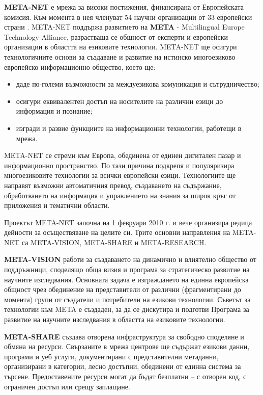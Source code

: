   \begin{multicols}{2}

    \textbf{META-NET} е мрежа за високи постижения, финансирана от Европейската
    комисия. Към момента в нея членуват 54 научни организации от 33 европейски страни \cite{rehm2011}. META-NET поддържа развитието
    на \textbf{META}  - Multilingual Europe Technology Alliance, разрастваща се общност от експерти и
    европейски организации в областта на езиковите
    технологии. META-NET ще осигури  технологичните основи за създаване и развитие на истинско многоезиково европейско информационно общество, което ще:

  \begin{itemize}
  \item даде по-големи възможности за междуезикова комуникация и сътрудничество;
  \item осигури еквивалентен достъп на носителите на различни езици до информация и познание;
  \item изгради и развие функциите на информационни технологии, работещи в мрежа.
  \end{itemize}

META-NET  се стреми към Европа, обединена от единен дигитален пазар и информационно пространство. По тази причина подкрепя и популяризира многоезиковите технологии за всички
  европейски езици. Технологиите ще направят възможни автоматичния
  превод, създаването на съдържание, обработването на информация и
  управлението на знания за широк кръг от приложения и тематични
  области. 

  Проектът META-NET започна на 1 февруари 2010 г.  и вече организира редица дейности  за осъществяване на целите си. Трите основни направления на META-NET
  са META-VISION, META-SHARE и META-RESEARCH.

  \textbf{META-VISION} работи за създаването на динамично и влиятелно
  общество от поддръжници, споделящо обща визия и програма за
  стратегическо развитие на научните изследвания. Основната задача е
  изграждането на единна европейска общност чрез обединение на
  представители от различни (фрагментирани до момента) групи от
  създатели и потребители на езикови технологии. Съветът за технологии към META е създаден, за да се дискутира и подготви Програма за развитие на научните изследвания в областта на езиковите технологии.

  \textbf{META-SHARE} създава отворена инфраструктура за свободно
  споделяне и обмяна на ресурси. Свързаните в мрежа центрове ще съдържат
  езикови данни, програми и уеб услуги, документирани с представителни
  метаданни, организирани в категории, лесно достъпни, обединени от
  единна система за търсене.  Предоставените ресурси могат да бъдат
  безплатни -- с отворен код, с ограничен достъп или срещу
  заплащане. 


\end{multicols}
